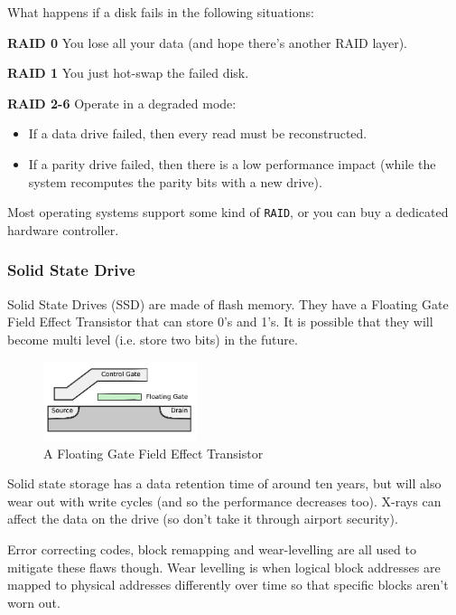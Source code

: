 What happens if a disk fails in the following situations:

\begin{description}
  \item \textbf{RAID 0} You lose all your data (and hope there's another RAID
    layer).
  \item \textbf{RAID 1} You just hot-swap the failed disk.
  \item \textbf{RAID 2-6} Operate in a degraded mode:
    \begin{itemize}
      \item If a data drive failed, then every read must be reconstructed.
      \item If a parity drive failed, then there is a low performance impact
        (while the system recomputes the parity bits with a new drive).
    \end{itemize}
\end{description}

Most operating systems support some kind of \texttt{RAID}, or you can buy a
dedicated hardware controller.

\subsubsection{Solid State Drive}

Solid State Drives (SSD) are made of flash memory. They have a Floating Gate
Field Effect Transistor that can store 0's and 1's. It is possible that they
will become multi level (i.e. store two bits) in the future.

\begin{figure}[H]
  \centering
  \includegraphics[width=0.4\textwidth]{images/fgfet}
  \caption{A Floating Gate Field Effect Transistor}
  \label{fgfet}
\end{figure}

Solid state storage has a data retention time of around ten years, but will also
wear out with write cycles (and so the performance decreases too). X-rays can
affect the data on the drive (so don't take it through airport security).

Error correcting codes, block remapping and wear-levelling are all used to
mitigate these flaws though. Wear levelling is when logical block addresses are
mapped to physical addresses differently over time so that specific blocks
aren't worn out.

